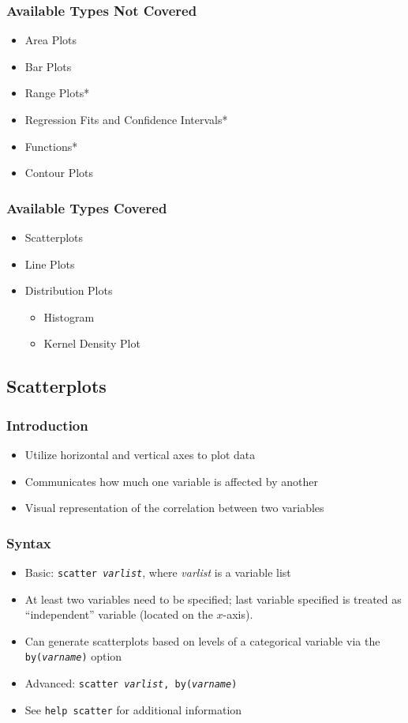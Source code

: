 \documentclass{beamer}
\begin{document}
\begin{frame}
	\frametitle{Available Types Not Covered}
		\begin{itemize}
			\item Area Plots
			\item Bar Plots
			\item Range Plots*
			\item Regression Fits and Confidence Intervals*
			\item Functions*
			\item Contour Plots
		\end{itemize}
\end{frame}

\begin{frame}
	\frametitle{Available Types Covered}
		\begin{itemize}
			\item Scatterplots
			\item Line Plots
			\item Distribution Plots
				\begin{itemize}
					\item Histogram
					\item Kernel Density Plot
				\end{itemize}
		\end{itemize}
\end{frame}

\subsection{Scatterplots}

\begin{frame}
	\frametitle{Introduction}
		\begin{itemize}
			\item Utilize horizontal and vertical axes to plot data
			\item Communicates how much one variable is affected by another
			\item Visual representation of the correlation between two variables
		\end{itemize}
\end{frame}

\begin{frame}
	\frametitle{Syntax}
		\begin{itemize}
			\item Basic: \texttt{scatter \textit{varlist}}, where \textit{varlist} is a variable list
			\item At least two variables need to be specified; last variable specified is treated as ``independent'' variable (located on the $x$-axis).
			\item Can generate scatterplots based on levels of a categorical variable via the \texttt{by(\textit{varname})} option
			\item Advanced: \texttt{scatter \textit{varlist}, by(\textit{varname})}
			\item See \texttt{help scatter} for additional information
		\end{itemize}
\end{frame}
\end{document}
